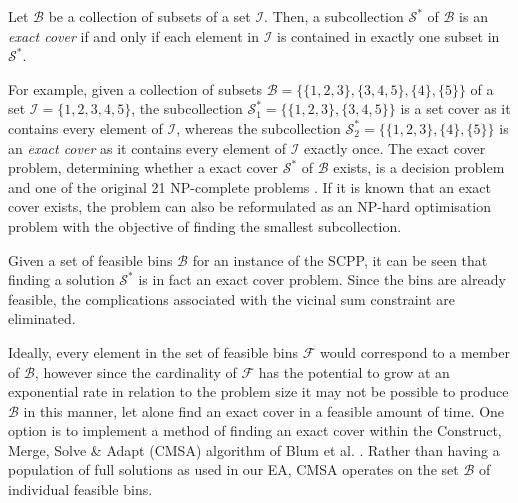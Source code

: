 \documentclass[a4paper,11pt,authoryear]{elsarticle}
\begin{document}
\begin{definition}
	Let $\mathcal{B}$ be a collection of subsets of a set $\mathcal{I}$. Then, a subcollection $\mathcal{S}^*$ of $\mathcal{B}$ is an \emph{exact cover} if and only if each element in $\mathcal{I}$ is contained in exactly one subset in $\mathcal{S}^*$.
	\label{defn:exactcover}
\end{definition}	

\noindent For example, given a collection of subsets $\mathcal{B} = \{\{1,2,3\}, \{3,4,5\}, \{4\}, \{5\}\}$ of a set $\mathcal{I} = \{1,2,3,4,5\}$, the subcollection $\mathcal{S}^*_1 = \{\{1,2,3\}, \{3,4,5\}\}$ is a set cover as it contains every element of $\mathcal{I}$, whereas the subcollection $\mathcal{S}^*_2 = \{\{1,2,3\}, \{4\}, \{5\}\}$ is an \emph{exact cover} as it contains every element of $\mathcal{I}$ exactly once. The exact cover problem, determining whether a exact cover $\mathcal{S}^*$ of $\mathcal{B}$ exists, is a decision problem and one of the original 21 NP-complete problems \cite{karp1972}. If it is known that an exact cover exists, the problem can also be reformulated as an NP-hard optimisation problem with the objective of finding the smallest subcollection.

Given a set of feasible bins $\mathcal{B}$ for an instance of the SCPP, it can be seen that finding a solution $\mathcal{S}^*$ is in fact an exact cover problem. Since the bins are already feasible, the complications associated with the vicinal sum constraint are eliminated.

Ideally, every element in the set of feasible bins $\mathcal{F}$ would correspond to a member of $\mathcal{B}$, however since the cardinality of $\mathcal{F}$ has the potential to grow at an exponential rate in relation to the problem size it may not be possible to produce $\mathcal{B}$ in this manner, let alone find an exact cover in a feasible amount of time. One option is to implement a method of finding an exact cover within the Construct, Merge, Solve \& Adapt (CMSA) algorithm of Blum et al. \cite{blum2016}. Rather than having a population of full solutions as used in our EA, CMSA operates on the set $\mathcal{B}$ of individual feasible bins.

\end{document}
